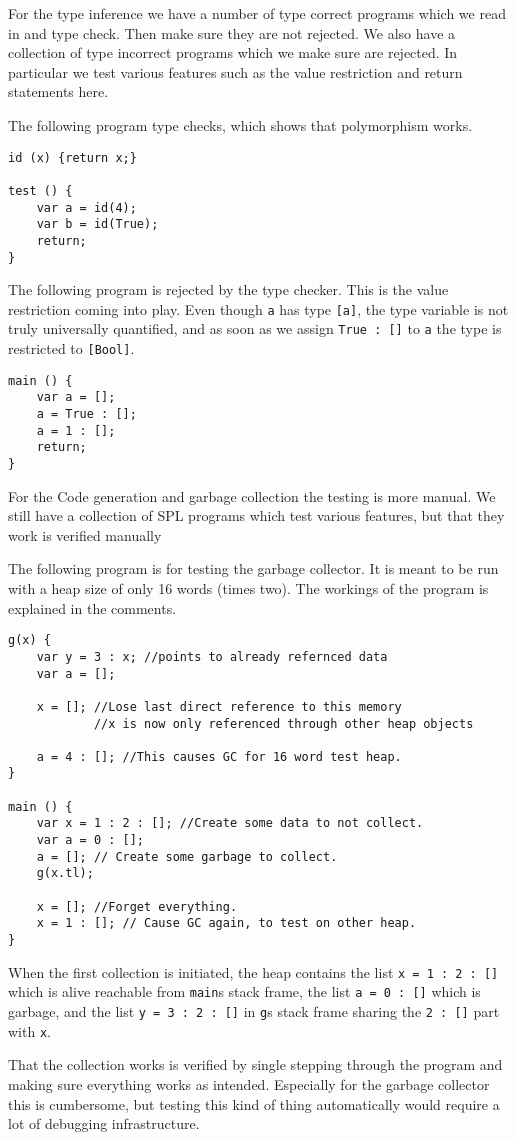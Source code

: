 \documentclass{scrartcl}
\begin{document}
For the type inference we have a number of type correct programs
which we read in and type check. Then make sure they are not rejected.
We also have a collection of type incorrect programs which we make
sure are rejected. In particular we test various features such as the
value restriction and return statements here.

The following program type checks, which shows that polymorphism works.
\begin{lstlisting}
id (x) {return x;}

test () {
    var a = id(4);
    var b = id(True);
    return;
}
\end{lstlisting}
The following program is rejected by the type checker. This is the
value restriction coming into play. Even though \lstinline{a} has
type \lstinline{[a]}, the type variable is not truly universally
quantified, and as soon as we assign \lstinline{True : []} to \lstinline{a}
the type is restricted to \lstinline{[Bool]}.
\begin{lstlisting}
main () {
    var a = [];
    a = True : [];
    a = 1 : [];
    return;
}
\end{lstlisting}

For the Code generation and garbage collection the testing is more
manual. We still have a collection of SPL programs which test various
features, but that they work is verified manually


The following program is for testing the garbage collector. It is meant
to be run with a heap size of only 16 words (times two).
The workings of the program is explained in the comments.
\begin{lstlisting}
g(x) {
    var y = 3 : x; //points to already refernced data
    var a = [];

    x = []; //Lose last direct reference to this memory
            //x is now only referenced through other heap objects

    a = 4 : []; //This causes GC for 16 word test heap.
}

main () {
    var x = 1 : 2 : []; //Create some data to not collect.
    var a = 0 : [];
    a = []; // Create some garbage to collect.
    g(x.tl);

    x = []; //Forget everything.
    x = 1 : []; // Cause GC again, to test on other heap.
}
\end{lstlisting}
When the first collection is initiated, the heap contains the list
\lstinline{x = 1 : 2 : []} which is alive reachable from \lstinline{main}s 
stack frame,
the list \lstinline{a = 0 : []} which is garbage, and the list 
\lstinline{y = 3 : 2 : []} in \lstinline{g}s stack frame sharing the
\lstinline{2 : []} part with \lstinline{x}.

That the collection works is verified by single stepping through the 
program and making sure everything works as intended. Especially for
the garbage collector this is cumbersome, but testing this kind of 
thing automatically would require a lot of debugging infrastructure.

\printbibliography
\end{document}
